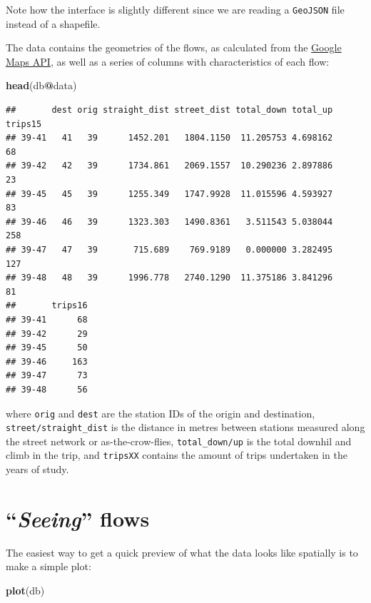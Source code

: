 \documentclass[]{book}
\newenvironment{Shaded}{\begin{snugshade}}{\end{snugshade}}
\newcommand{\KeywordTok}[1]{\textcolor[rgb]{0.13,0.29,0.53}{\textbf{#1}}}
\newcommand{\NormalTok}[1]{#1}
\newcommand{\OperatorTok}[1]{\textcolor[rgb]{0.81,0.36,0.00}{\textbf{#1}}}
\begin{document}
Note how the interface is slightly different since we are reading a \texttt{GeoJSON} file instead of a shapefile.

The data contains the geometries of the flows, as calculated from the \href{https://developers.google.com/maps/}{Google Maps API}, as well as a series of columns with characteristics of each flow:

\begin{Shaded}
\begin{Highlighting}[]
\KeywordTok{head}\NormalTok{(db}\OperatorTok{@}\NormalTok{data)}
\end{Highlighting}
\end{Shaded}

\begin{verbatim}
##       dest orig straight_dist street_dist total_down total_up trips15
## 39-41   41   39      1452.201   1804.1150  11.205753 4.698162      68
## 39-42   42   39      1734.861   2069.1557  10.290236 2.897886      23
## 39-45   45   39      1255.349   1747.9928  11.015596 4.593927      83
## 39-46   46   39      1323.303   1490.8361   3.511543 5.038044     258
## 39-47   47   39       715.689    769.9189   0.000000 3.282495     127
## 39-48   48   39      1996.778   2740.1290  11.375186 3.841296      81
##       trips16
## 39-41      68
## 39-42      29
## 39-45      50
## 39-46     163
## 39-47      73
## 39-48      56
\end{verbatim}

where \texttt{orig} and \texttt{dest} are the station IDs of the origin and destination, \texttt{street/straight\_dist} is the distance in metres between stations measured along the street network or as-the-crow-flies, \texttt{total\_down/up} is the total downhil and climb in the trip, and \texttt{tripsXX} contains the amount of trips undertaken in the years of study.

\hypertarget{seeing-flows}{%
\section{\texorpdfstring{``\emph{Seeing}'' flows}{``Seeing'' flows}}\label{seeing-flows}}

The easiest way to get a quick preview of what the data looks like spatially is to make a simple plot:

\begin{Shaded}
\begin{Highlighting}[]
\KeywordTok{plot}\NormalTok{(db)}
\end{Highlighting}
\end{Shaded}
\end{document}
